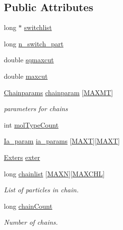 \subsection*{Public Attributes}
\begin{DoxyCompactItemize}
\item 
long $\ast$ \hyperlink{struct_topo_a0ecb4fc994f31c3d02d78b150df71057}{switchlist}
\item 
long \hyperlink{struct_topo_a2df8a376cf0d57fba8b5a2513aafcd40}{n\+\_\+switch\+\_\+part}
\item 
double \hyperlink{struct_topo_a1f0ab42bb23e360ab07bb5439689b5f1}{sqmaxcut}
\item 
double \hyperlink{struct_topo_a5058af2ecbcdeb4282e1626198e28c42}{maxcut}
\item 
\hyperlink{struct_chainparams}{Chainparams} \hyperlink{struct_topo_ad2fd76157e249ae9f908389b98586662}{chainparam} \mbox{[}\hyperlink{macros_8h_ad002a98462c90c52983b122ab9e2059a}{M\+A\+X\+M\+T}\mbox{]}
\begin{DoxyCompactList}\small\item\em parameters for chains \end{DoxyCompactList}\item 
int \hyperlink{struct_topo_a08924478d50743e66665a92a52110dd1}{mol\+Type\+Count}
\item 
\hyperlink{struct_ia__param}{Ia\+\_\+param} \hyperlink{struct_topo_a1e4ad27565a7c682ab00ad9791d06e71}{ia\+\_\+params} \mbox{[}\hyperlink{macros_8h_a3f79fdecc884eb98c97d1bdc77455295}{M\+A\+X\+T}\mbox{]}\mbox{[}\hyperlink{macros_8h_a3f79fdecc884eb98c97d1bdc77455295}{M\+A\+X\+T}\mbox{]}
\item 
\hyperlink{struct_exters}{Exters} \hyperlink{struct_topo_ac95b97650335d237d33f1da999db43ae}{exter}
\item 
long \hyperlink{struct_topo_ab4216e46c501eaca30955d5c033cf964}{chainlist} \mbox{[}\hyperlink{macros_8h_ad1f79d9d99776d7353c6659c307c83c6}{M\+A\+X\+N}\mbox{]}\mbox{[}\hyperlink{macros_8h_a6ba68031db49c489a6a5902f87b915c8}{M\+A\+X\+C\+H\+L}\mbox{]}
\begin{DoxyCompactList}\small\item\em List of particles in chain. \end{DoxyCompactList}\item 
long \hyperlink{struct_topo_a495b774a95d31633fc20355873c715ae}{chain\+Count}
\begin{DoxyCompactList}\small\item\em Number of chains. \end{DoxyCompactList}\item 

\end{DoxyCompactItemize}
